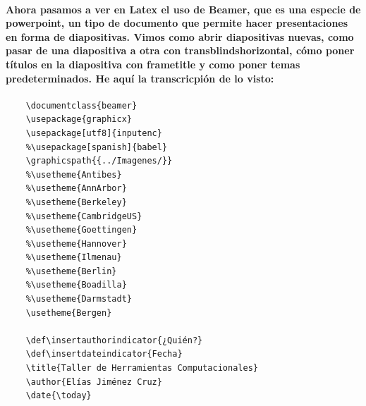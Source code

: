 \documentclass[letterpaper, 12pt, oneside]{article} %
\begin{document}
	\paragraph{Ahora pasamos a ver en Latex el uso de Beamer, que es una especie de powerpoint, un tipo de documento que permite hacer presentaciones en forma de diapositivas. Vimos como abrir diapositivas nuevas, como pasar de una diapositiva a otra con transblindshorizontal, cómo poner títulos en la diapositiva con frametitle y como poner temas predeterminados. He aquí la transcricpión de lo visto:}
	\begin{verbatim}
	\documentclass{beamer}
	\usepackage{graphicx}
	\usepackage[utf8]{inputenc}
	%\usepackage[spanish]{babel}
	\graphicspath{{../Imagenes/}}
	%\usetheme{Antibes}
	%\usetheme{AnnArbor}
	%\usetheme{Berkeley}
	%\usetheme{CambridgeUS}
	%\usetheme{Goettingen}
	%\usetheme{Hannover}
	%\usetheme{Ilmenau}
	%\usetheme{Berlin}
	%\usetheme{Boadilla}
	%\usetheme{Darmstadt}
	\usetheme{Bergen}
	
	\def\insertauthorindicator{¿Quién?}
	\def\insertdateindicator{Fecha}
	\title{Taller de Herramientas Computacionales}
	\author{Elías Jiménez Cruz}
	\date{\today}
	

\end{verbatim}
\end{document}
